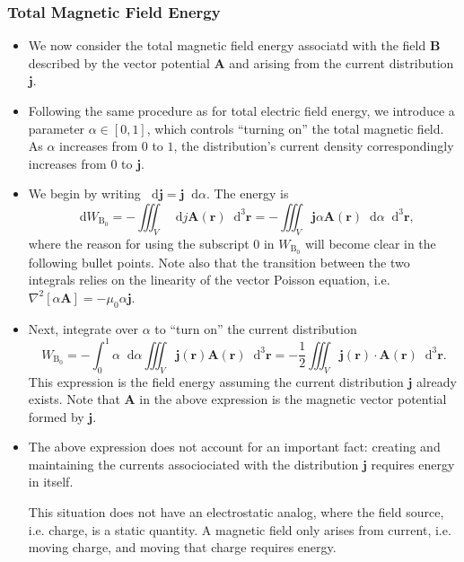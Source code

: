 \documentclass[11pt, a4paper]{article}
\newcommand{\diff}{\mathop{}\!\mathrm{d}} %
\newcommand{\dr}{\diff^{3} \r}  %
\renewcommand{\vec}[1]{\bm{#1}} %
\renewcommand{\r}{\vec{r}}
\newcommand{\B}{\vec{B}} %
\newcommand{\A}{\vec{A}} %
\newcommand{\mm}{\mu_{0}}  %
\renewcommand{\j}{\vec{j}}  %
\renewcommand{\laplacian}{\nabla^{2}}
\begin{document}
\subsubsection{Total Magnetic Field Energy}
\begin{itemize}
    \item We now consider the total magnetic field energy associatd with the field $ \B $ described by the vector potential $ \A $ and arising from the current distribution $ \j $. 

    \item Following the same procedure as for total electric field energy, we introduce a parameter $ \alpha \in [0, 1] $, which controls ``turning on'' the total magnetic field. As $ \alpha $ increases from $ 0 $ to $ 1 $, the distribution's current density correspondingly increases from $ 0 $ to $ \j $.

    \item We begin by writing $ \diff \j = \j \diff \alpha $. The energy is
    \begin{equation*}
        \diff W_{\text{B}_{0}} = - \iiint_{V} \diff j \A(\r) \dr = - \iiint_{V} \j \alpha \A(\r) \diff \alpha \dr,
    \end{equation*}
    where the reason for using the subscript $ 0 $ in $ W_{\text{B}_{0}} $ will become clear in the following bullet points. Note also that the transition between the two integrals relies on the linearity of the vector Poisson equation, i.e. $ \laplacian[\alpha \A] = - \mm \alpha \j $.

    \item Next, integrate over $ \alpha $ to ``turn on'' the current distribution
    \begin{equation*}
        W_{\text{B}_{0}}  = - \int_{0}^{1} \alpha \diff \alpha \iiint_{V} \j(\r)\A(\r)\dr = - \frac{1}{2} \iiint_{V} \j(\r) \cdot \A(\r) \dr.
    \end{equation*}
    This expression is the field energy assuming the current distribution $ \j $ already exists. Note that $ \A $ in the above expression is the magnetic vector potential formed by $ \j $.
    
    \item The above expression does not account for an important fact: creating and maintaining the currents associociated with the distribution $ \j $ requires energy in itself. 

    This situation does not have an electrostatic analog, where the field source, i.e. charge, is a static quantity. A magnetic field only arises from current, i.e. moving charge, and moving that charge requires energy.
    

\end{itemize}
\end{document}

